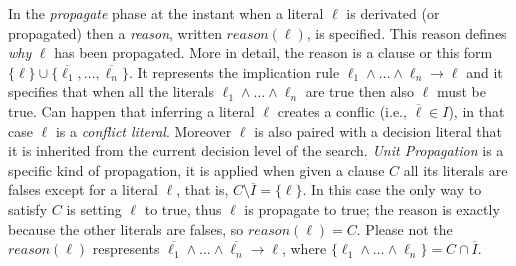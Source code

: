 In the \textit{propagate} phase at the instant when a literal $\ell$ is derivated 
(or propagated) then a \textit{reason}, written $\mathit{reason}(\ell)$, 
is specified. This reason defines \textit{why} $\ell$ has been propagated.
More in detail, the reason is a clause or this form 
$\{ \ell \} \cup \{\overline{\ell_1},\hdots, \overline{\ell_n}\}$. It represents the implication 
rule $\ell_1 \land \hdots \land \ell_n \rightarrow \ell$ and it specifies 
that when all the literals $\ell_1 \land \hdots \land \ell_n$ are true then also 
$\ell$ must be true.
Can happen that inferring a literal $\ell$ creates a conflic (i.e., $\overline{\ell} \in I$),
in that case $\ell$ is a \textit{conflict literal}.
Moreover $\ell$ is also paired with a decision literal 
that it is inherited from the current decision level of the search.
\textit{Unit Propagation} is a specific kind of propagation, it is applied when given a clause 
$C$ all its literals are falses except for a literal $\ell$, that is, $C \setminus \overline{I} = \{\ell\}$.
In this case the only way to satisfy $C$ is setting $\ell$ to true, thus $\ell$
is propagate to true; the reason is exactly because the other literals are falses, so 
$reason(\ell) = C$.
Please not the $reason(\ell)$ respresents $\overline{\ell_1} \land \hdots \land \overline{\ell_n} \rightarrow \ell$, where 
$\{\ell_1 \land \hdots \land \ell_n\} = C \cap \overline{I}$.

